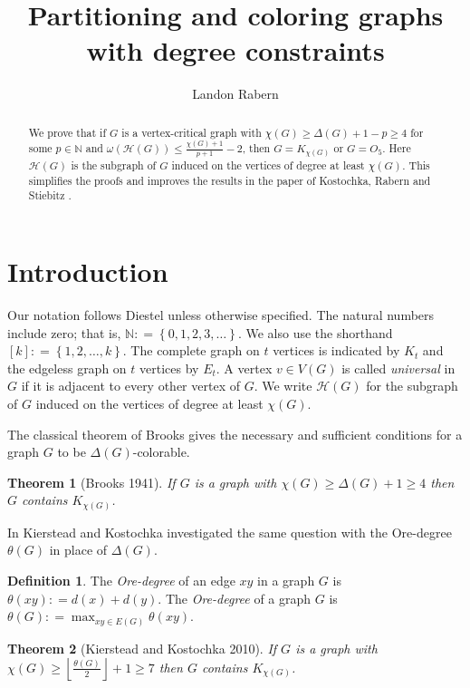 \documentclass[12pt]{amsart}
\title{Partitioning and coloring graphs with degree constraints}
\author{Landon Rabern}
\theoremstyle{plain}
\newtheorem{thm}{Theorem}[section]
\theoremstyle{definition}
\newtheorem{defn}{Definition}
\theoremstyle{remark}
\newcommand{\fancy}[1]{\mathcal{#1}}
\newcommand{\IN}{\mathbb{N}}
\newcommand{\set}[1]{\left\{ #1 \right\}}
\newcommand{\floor}[1]{\left\lfloor#1\right\rfloor}
\newcommand{\irange}[1]{\left[#1\right]}
\newcommand{\DefinedAs}{\mathrel{\mathop:}=}
\begin{document}
	\begin{abstract}
We prove that if $G$ is a vertex-critical graph with $\chi(G) \geq \Delta(G) + 1 - p \geq 4$
	for some $p \in \IN$ and $\omega(\fancy{H}(G)) \leq \frac{\chi(G) + 1}{p + 1} - 2$,
	then $G = K_{\chi(G)}$ or $G = O_5$.  Here $\fancy{H}(G)$ is the subgraph of $G$ induced on the vertices of degree at least $\chi(G)$.  This simplifies the proofs and improves the results in the paper of Kostochka, Rabern and Stiebitz \cite{krs_one}.
	\end{abstract}
	\maketitle

	\section{Introduction}
Our notation follows Diestel \cite{Diestel} unless otherwise specified.  
The natural numbers include zero; that is, $\IN \DefinedAs \set{0, 1, 2, 3, \ldots}$.  
We also use the shorthand $\irange{k} \DefinedAs \set{1, 2, \ldots, k}$.  
The complete graph on $t$ vertices is indicated by $K_t$ and the edgeless graph
on $t$ vertices by $E_t$.  A vertex $v \in V(G)$ is called \emph{universal} in $G$ if it is adjacent to every other vertex of $G$. We write $\fancy{H}(G)$ for the subgraph of $G$ induced on the vertices of degree at least $\chi(G)$.

The classical theorem of Brooks \cite{brooks1941colouring} gives the necessary and sufficient conditions for a graph $G$ to be $\Delta(G)$-colorable.

\begin{thm}[Brooks \cite{brooks1941colouring} 1941]
If $G$ is a graph with $\chi(G) \geq \Delta(G) + 1 \geq 4$ then $G$ contains $K_{\chi(G)}$.
\end{thm}

In \cite{kierstead2009ore} Kierstead and Kostochka investigated the same question with the 
Ore-degree $\theta(G)$ in place of $\Delta(G)$.

\begin{defn}
The \emph{Ore-degree} of an edge $xy$ in a graph $G$ is $\theta(xy) \DefinedAs d(x) + d(y)$.  The \emph{Ore-degree} of a graph $G$ is $\theta(G) \DefinedAs \max_{xy \in E(G)}\theta(xy)$.
\end{defn}

\begin{thm}[Kierstead and Kostochka \cite{kierstead2009ore} 2010]
If $G$ is a graph with $\chi(G) \geq \floor{\frac{\theta(G)}{2}} + 1 \geq 7$ then $G$ contains $K_{\chi(G)}$.
\end{thm}
\end{document}
